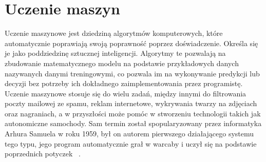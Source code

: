 \chapter{Uczenie maszyn}
Uczenie maszynowe jest dziedziną algorytmów komputerowych, które automatycznie poprawiają swoją poprawność poprzez doświadczenie. 
Określa się je jako poddziedzinę sztucznej inteligencji. Algorytmy te pozwalają na zbudowanie matematycznego modelu na podstawie 
przykładowych danych nazywanych danymi treningowymi, co pozwala im na wykonywanie predykcji lub decyzji bez potrzeby ich dokładnego 
zaimplementowania przez programistę. Uczenie maszynowe stosuje się do wielu zadań, między innymi do filtrowania poczty mailowej ze spamu, reklam internetowe, 
wykrywania twarzy na zdjęciach oraz nagraniach, a w przyszłości może pomóc w stworzeniu technologii takich jak 
autonomiczne samochody. Sam termin został spopularyzowany przez informatyka Arhura Samuela w roku 1959, był on autorem pierwszego działającego 
systemu tego typu, jego program automatycznie grał w warcaby i uczył się na podstawie poprzednich potyczek ~\cite{MLBasics}. 
